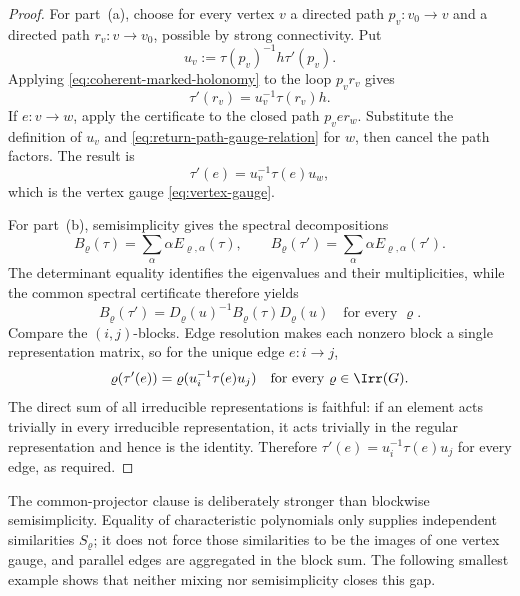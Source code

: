 \begin{proof}
  For part~(a), choose for every vertex \(v\) a directed path \(p_v:v_0\to v\)
  and a directed path \(r_v:v\to v_0\), possible by strong connectivity.
  Put
  \[
    u_v:=\tau(p_v)^{-1}h\tau'(p_v).
  \]
  Applying \eqref{eq:coherent-marked-holonomy} to the loop \(p_vr_v\)
  gives
  \begin{equation}\label{eq:return-path-gauge-relation}
    \tau'(r_v)=u_v^{-1}\tau(r_v)h.
  \end{equation}
  If \(e:v\to w\), apply the certificate to the closed path
  \(p_ver_w\).  Substitute the definition of \(u_v\) and
  \eqref{eq:return-path-gauge-relation} for \(w\), then cancel the path
  factors.  The result is
  \[
    \tau'(e)=u_v^{-1}\tau(e)u_w,
  \]
  which is the vertex gauge \eqref{eq:vertex-gauge}.

  For part~(b), semisimplicity gives the spectral decompositions
  \[
    B_\varrho(\tau)=\sum_\alpha
      \alpha E_{\varrho,\alpha}(\tau),
    \qquad
    B_\varrho(\tau')=\sum_\alpha
      \alpha E_{\varrho,\alpha}(\tau').
  \]
  The determinant equality identifies the eigenvalues and their
  multiplicities, while the common spectral certificate therefore yields
  \[
    B_\varrho(\tau')
    =D_\varrho(u)^{-1}B_\varrho(\tau)D_\varrho(u)
    \quad\text{for every }\varrho.
  \]
  Compare the \((i,j)\)-blocks.  Edge resolution makes each nonzero block a
  single representation matrix, so for the unique edge \(e:i\to j\),
  \[
    \varrho(\tau'(e))
    =\varrho(u_i^{-1}\tau(e)u_j)
    \quad\text{for every }\varrho\in\Irr(G).
  \]
  The direct sum of all irreducible representations is faithful: if an
  element acts trivially in every irreducible representation, it acts
  trivially in the regular representation and hence is the identity.
  Therefore \(\tau'(e)=u_i^{-1}\tau(e)u_j\) for every edge, as required.
\end{proof}

The common-projector clause is deliberately stronger than blockwise
semisimplicity.  Equality of characteristic polynomials only supplies
independent similarities \(S_\varrho\); it does not force those similarities
to be the images of one vertex gauge, and parallel edges are aggregated in
the block sum.  The following smallest example shows that neither mixing nor
semisimplicity closes this gap.

